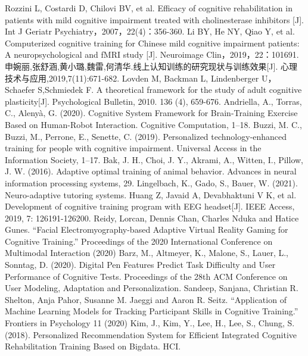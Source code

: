 \documentclass[12pt]{article}
\begin{document}
    
    \begin{thebibliography}{99}  

        Rozzini L, Costardi D, Chilovi BV, et al. Efficacy of cognitive rehabilitation in patients with mild cognitive impairment treated with cholinesterase inhibitors [J]. Int J Geriatr Psychiatry，2007，22(4)：356-360.
        Li BY, He NY, Qiao Y, et al. Computerized cognitive training for Chinese mild cognitive impairment patients: A neuropsychological and fMRI study [J]. Neuroimage Clin，2019，22：101691.
        申婉丽,张舒涵,黄小璐,魏雷,何清华.线上认知训练的研究现状与训练效果[J]. 心理技术与应用,2019,7(11):671-682.
        Lovden M, Backman L, Lindenberger U，Schaefer S,Schmiedek F. A theoretical framework for the study of adult cognitive plasticity[J]. Psychological Bulletin, 2010. 136 (4), 659-676.
        Andriella, A., Torras, C.,  Alenyà, G. (2020). Cognitive System Framework for Brain-Training Exercise Based on Human-Robot Interaction. Cognitive Computation, 1–18.
        Buzzi, M. C., Buzzi, M., Perrone, E., Senette, C. (2019). Personalized technology-enhanced training for people with cognitive impairment. Universal Access in the Information Society, 1–17. 
        Bak, J. H., Choi, J. Y., Akrami, A., Witten, I.,  Pillow, J. W. (2016). Adaptive optimal training of animal behavior. Advances in neural information processing systems, 29.
        Lingelbach, K., Gado, S.,  Bauer, W. (2021). Neuro-adaptive tutoring systems. 
        Huang Z, Javaid A, Devabhaktuni V K, et al. Development of cognitive training program with EEG headset[J]. IEEE Access, 2019, 7: 126191-126200.
        Reidy, Lorcan, Dennis Chan, Charles Nduka and Hatice Gunes. “Facial Electromyography-based Adaptive Virtual Reality Gaming for Cognitive Training.” Proceedings of the 2020 International Conference on Multimodal Interaction (2020)
        Barz, M., Altmeyer, K., Malone, S., Lauer, L., Sonntag, D. (2020). Digital Pen Features Predict Task Difficulty and User Performance of Cognitive Tests. Proceedings of the 28th ACM Conference on User Modeling, Adaptation and Personalization. 
        Sandeep, Sanjana, Christian R. Shelton, Anja Pahor, Susanne M. Jaeggi and Aaron R. Seitz. “Application of Machine Learning Models for Tracking Participant Skills in Cognitive Training.” Frontiers in Psychology 11 (2020)
        Kim, J., Kim, Y., Lee, H., Lee, S.,  Chung, S. (2018). Personalized Recommendation System for Efficient Integrated Cognitive Rehabilitation Training Based on Bigdata. HCI.

\end{thebibliography}
\end{document}
